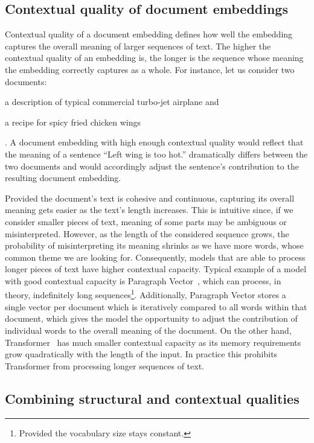 \subsection{Contextual quality of document embeddings}


Contextual quality of a document embedding defines how well the embedding
captures the overall meaning of larger sequences of text. The higher the
contextual quality of an embedding is, the longer is the sequence whose meaning
the embedding correctly captures as a whole. For instance, let us consider two
documents: \begin{enumerate*}
  \item a description of typical commercial turbo-jet airplane
    and\label{enumitem:plane}
  \item a recipe for spicy fried chicken wings\label{enumitem:chicken}
\end{enumerate*}.
A document embedding with high enough contextual quality would reflect that the
meaning of a sentence ``Left wing is too hot.'' dramatically differs between
the two documents and would accordingly adjust the sentence's contribution to
the resulting document embedding.

Provided the document's text is cohesive and continuous, capturing its overall
meaning gets easier as the text's length increases. This is intuitive since,
if we consider smaller pieces of text, meaning of some parts may be ambiguous
or misinterpreted. However, as the length of the considered sequence grows, the
probability of misinterpreting its meaning shrinks as we have more words, whose
common theme we are looking for. Consequently, models that are able to process longer
pieces of text have higher contextual capacity. Typical example of a model with
good contextual capacity is Paragraph Vector~\citep{le2014distributed}, which
can process, in theory, indefinitely long sequences\footnote{Provided the
vocabulary size stays constant.}. Additionally, Paragraph Vector stores a
single vector per document which is iteratively compared to all words within
that document, which gives the model the opportunity to adjust the contribution
of individual words to the overall meaning of the document. On the other hand,
Transformer~\citep{vaswani2017attention} has much smaller contextual capacity
as its memory requirements grow quadratically with the length of the input. In
practice this prohibits Transformer from processing longer sequences of text.

\subsection{Combining structural and contextual
qualities}\label{section:combine_structural_and_contextual}

